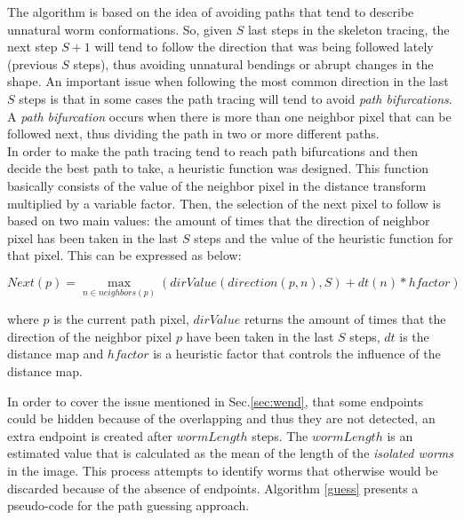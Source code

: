 The algorithm is based on the idea of avoiding paths that tend to describe 
unnatural worm conformations. So, given $S$ last steps in the skeleton tracing, 
the next step $S+1$ will tend to follow the direction that was being followed
lately (previous $S$ steps), 
thus avoiding unnatural bendings or abrupt changes in the shape. 
An important issue when following the most common direction in the 
last $S$ steps is that in some cases
the path tracing will tend to avoid \emph{path bifurcations}. 
A \emph{path bifurcation} occurs when there is more than one neighbor pixel that can be 
followed next, thus dividing the path in two or more different paths.\\

In order to make the path tracing tend to reach path bifurcations and then decide the best
path to take, a heuristic function was designed. This function basically 
consists of the value of the neighbor pixel
in the distance transform multiplied by a variable factor.
Then, the selection of the next pixel to follow is based on two main values:
the amount of times that the direction of neighbor pixel has been taken in the last $S$ steps and
the value of the heuristic function for that pixel. This can be expressed as below:

$$Next(p) = \max_{n \in neighbors(p)} (dirValue(direction(p,n),S) + dt(n)*hfactor)$$

where $p$ is the current path pixel, $dirValue$ returns the amount of times that the 
direction of the neighbor pixel $p$ have been taken in the last $S$ steps, $dt$ is the 
distance map and $hfactor$ is a heuristic factor that controls the influence of the
distance map.

In order to cover the issue mentioned in Sec.\ref{sec:wend}, that some endpoints could
be hidden because of the overlapping and thus they are not detected, an extra endpoint is created after $wormLength$ steps.
The $wormLength$ is an estimated value that is calculated
as the mean of the length of the \emph{isolated worms} in the image. This process
attempts to identify worms that otherwise would be discarded because of the absence
of endpoints. Algorithm \ref{guess} presents a pseudo-code for the path
guessing approach.

